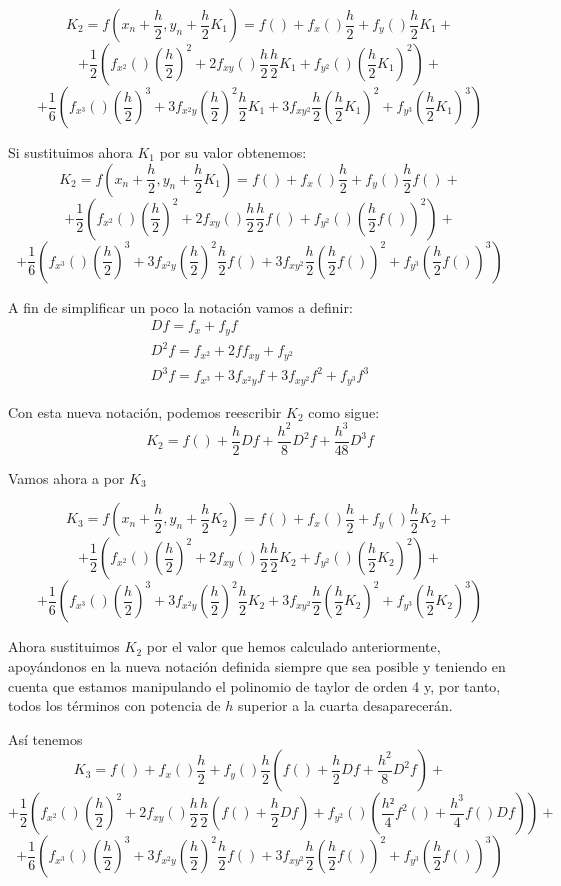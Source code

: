 \documentclass[nochap]{apuntes}
\begin{document}
\[K_2 = f\left(x_n+\frac{h}{2},y_n+\frac{h}{2}K_1\right)=f()+f_x()\frac{h}{2}+f_y()\frac{h}{2}K_1 +\]
\[+ \frac{1}{2}\left( f_{x^2}()\left(\frac{h}{2}\right)^2 +2 f_{xy}()\frac{h}{2}\frac{h}{2}K_1 +f_{y^2}()\left(\frac{h}{2}K_1\right)^2\right) +\]
\[+   \frac{1}{6}\left( f_{x^3}()\left(\frac{h}{2}\right)^3 + 3f_{x^2y}\left(\frac{h}{2}\right)^2\frac{h}{2}K_1 + 3f_{xy^2}\frac{h}{2}\left(\frac{h}{2}K_1\right)^2 + f_{y^3}\left(\frac{h}{2}K_1\right)^3\right)\]

Si sustituimos ahora $K_1$ por su valor obtenemos:
\[K_2 = f\left(x_n+\frac{h}{2},y_n+\frac{h}{2}K_1\right)=f()+f_x()\frac{h}{2}+f_y()\frac{h}{2}f() +\]
\[+ \frac{1}{2}\left( f_{x^2}()\left(\frac{h}{2}\right)^2 +2 f_{xy}()\frac{h}{2}\frac{h}{2}f() +f_{y^2}()\left(\frac{h}{2}f()\right)^2\right) +\]
\[+   \frac{1}{6}\left( f_{x^3}()\left(\frac{h}{2}\right)^3 + 3f_{x^2y}\left(\frac{h}{2}\right)^2\frac{h}{2}f() + 3f_{xy^2}\frac{h}{2}\left(\frac{h}{2}f()\right)^2 + f_{y^3}\left(\frac{h}{2}f()\right)^3\right)\]

A fin de simplificar un poco la notación vamos a definir:
\[\begin{array}{l}
Df = f_x+f_yf\\
D^2f = f_{x^2}+2ff_{xy}+f_{y^2}\\
D^3f = f_{x^3} + 3f_{x^2y}f + 3f_{xy^2}f^2 + f_{y^3}f^3
\end{array}\]

Con esta nueva notación, podemos reescribir $K_2$ como sigue:
\[K_2 = f() + \frac{h}{2}Df + \frac{h^2}{8}D^2f + \frac{h^3}{48}D^3f\]

Vamos ahora a por $K_3$

\[K_3 = f\left(x_n+\frac{h}{2},y_n+\frac{h}{2}K_2\right)=f()+f_x()\frac{h}{2}+f_y()\frac{h}{2}K_2 +\]
\[+ \frac{1}{2}\left( f_{x^2}()\left(\frac{h}{2}\right)^2 +2 f_{xy}()\frac{h}{2}\frac{h}{2}K_2 +f_{y^2}()\left(\frac{h}{2}K_2\right)^2\right) +\]
\[+   \frac{1}{6}\left( f_{x^3}()\left(\frac{h}{2}\right)^3 + 3f_{x^2y}\left(\frac{h}{2}\right)^2\frac{h}{2}K_2 + 3f_{xy^2}\frac{h}{2}\left(\frac{h}{2}K_2\right)^2 + f_{y^3}\left(\frac{h}{2}K_2\right)^3\right)\]

Ahora sustituimos $K_2$ por el valor que hemos calculado anteriormente, apoyándonos en la nueva notación definida siempre que sea posible y teniendo en cuenta que estamos manipulando el polinomio de taylor de orden 4 y, por tanto, todos los términos con potencia de $h$ superior a la cuarta desaparecerán.

Así tenemos
\[K_3 =f()+f_x()\frac{h}{2}+f_y()\frac{h}{2}\left( f()+\frac{h}{2}Df + \frac{h^2}{8}D^2f\right) +\]
\[+ \frac{1}{2}\left( f_{x^2}()\left(\frac{h}{2}\right)^2 +2 f_{xy}()\frac{h}{2}\frac{h}{2}\left(f() + \frac{h}{2}Df \right) +f_{y^2}()\left(\frac{h²}{4}f^2()+\frac{h^3}{4}f()Df\right)\right) +\]
\[+\frac{1}{6}\left( f_{x^3}()\left(\frac{h}{2}\right)^3 + 3f_{x^2y}\left(\frac{h}{2}\right)^2\frac{h}{2}f()+ 3f_{xy^2}\frac{h}{2}\left(\frac{h}{2}f()\right)^2 + f_{y^3}\left(\frac{h}{2}f()\right)^3\right)\]
\end{document}
